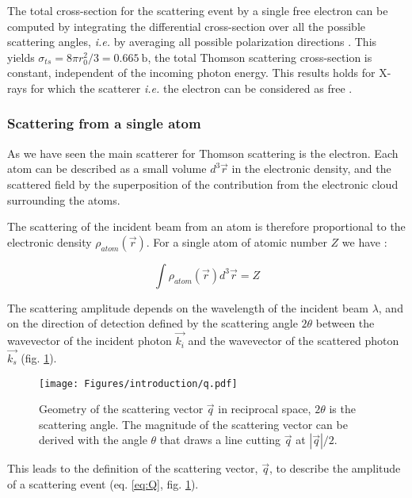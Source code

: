 The total cross-section for the scattering event by a single free electron can be computed by integrating the differential cross-section over all the possible scattering angles, {\color{DarkOrange}\textit{i.e.}} by averaging all possible polarization directions \parencite{Willmott}.
This yields $\sigma_{ts} = 8 \pi r_0^2 /3 = 0.665 \:\si{\barn}$, the total Thomson scattering cross-section is constant, independ{\color{DarkOrange}e}nt of the incoming photon energy. This results holds for X-rays for which the scatterer {\color{DarkOrange}\textit{i.e.}} the electron can be considered as free \parencite{Willmott}.

\subsubsection{Scattering from a single atom}

As we have seen the main scatterer for Thomson scattering is the electron.
Each atom can be described as a small volume $d^3\vec{r}$ in the electronic density, and the scattered field by the superposition of the contribution from the electronic cloud surrounding the atoms.

The scattering of the incident beam from an atom is therefore proportional to the electronic density $\rho_{atom}(\vec{r})$.
For a single atom of atomic number $Z$ we have :

\begin{equation}
    \int \rho_{atom} (\vec{r}) d^3\vec{r} = Z
\end{equation}

The scattering amplitude {\color{DarkOrange}depends} on the wavelength of the incident beam $\lambda$, and on the direction of detection defined by the scattering angle $2\theta$ between the wavevector of the incident photon $\vec{k_i}$ and the wavevector of the scattered photon $\vec{k_s}$ (fig. \ref{fig:q}).

\begin{figure}[!htb]
    \centering
    \texttt{[image: Figures/introduction/q.pdf]}
    \caption{Geometry of the scattering vector $\vec{q}$ in reciprocal space, $2\theta$ is the scattering angle. The magnitude of the scattering vector can be derived with the angle $\theta$ that draws a line cutting $\vec{q}$ at $|\vec{q}|/2$.}
    \label{fig:q}
\end{figure}

This leads to the definition of the scattering vector, $\vec{q}$, to describe the amplitude of a scattering event (eq. \ref{eq:Q}, fig. \ref{fig:q}).

